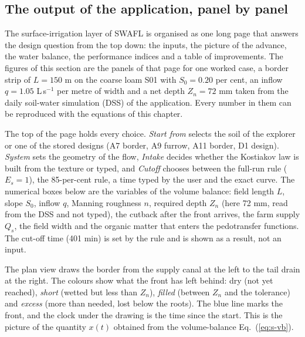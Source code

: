 \subsection{The output of the application, panel by panel}
The surface-irrigation layer of SWAFL is organised as one long page that answers the design question from the top down: the inputs, the picture of the advance, the water balance, the performance indices and a table of improvements. The figures of this section are the panels of that page for one worked case, a border strip of $L=150$ m on the coarse loam S01 with $S_0=0.20$ per cent, an inflow $q=1.05$ L\,s$^{-1}$ per metre of width and a net depth $Z_n=72$ mm taken from the daily soil-water simulation (DSS) of the application. Every number in them can be reproduced with the equations of this chapter.

The top of the page holds every choice. \emph{Start from} selects the soil of the explorer or one of the stored designs (A7 border, A9 furrow, A11 border, D1 design). \emph{System} sets the geometry of the flow, \emph{Intake} decides whether the Kostiakov law is built from the texture or typed, and \emph{Cutoff} chooses between the full-run rule ($E_s=1$), the 85-per-cent rule, a time typed by the user and the exact curve. The numerical boxes below are the variables of the volume balance: field length $L$, slope $S_0$, inflow $q$, Manning roughness $n$, required depth $Z_n$ (here 72 mm, read from the DSS and not typed), the cutback after the front arrives, the farm supply $Q_s$, the field width and the organic matter that enters the pedotransfer functions. The cut-off time (401 min) is set by the rule and is shown as a result, not an input.


The plan view draws the border from the supply canal at the left to the tail drain at the right. The colours show what the front has left behind: dry (not yet reached), \emph{short} (wetted but less than $Z_n$), \emph{filled} (between $Z_n$ and the tolerance) and \emph{excess} (more than needed, lost below the roots). The blue line marks the front, and the clock under the drawing is the time since the start. This is the picture of the quantity $x(t)$ obtained from the volume-balance Eq.~(\ref{eq:s-vb}).

